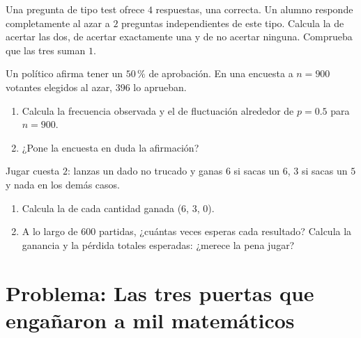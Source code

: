 \begin{exercise}[$\star\star$]\label{exo:g10:proba:7}
Una pregunta de tipo test ofrece $4$ respuestas, una correcta. Un alumno
responde completamente al azar a $2$ preguntas independientes de este
tipo. Calcula la  de acertar las dos, de acertar exactamente
una y de no acertar ninguna. Comprueba que las tres  suman
$1$.
\end{exercise}

\begin{exercise}[$\star\star$]\label{exo:g10:proba:8}
Un político afirma tener un $50\,\%$ de aprobación. En una encuesta a
$n = 900$ votantes elegidos al azar, $396$ lo aprueban.
\begin{enumerate}
  \item Calcula la frecuencia observada y el  de fluctuación
        alrededor de $p = 0.5$ para $n = 900$.
  \item ¿Pone la encuesta en duda la afirmación?
\end{enumerate}
\end{exercise}

\begin{exercise}[$\star\star\star$]\label{exo:g10:proba:9}
Jugar cuesta $2$: lanzas un dado no trucado y ganas $6$ si sacas un $6$,
$3$ si sacas un $5$ y nada en los demás casos.
\begin{enumerate}
  \item Calcula la  de cada cantidad ganada ($6$, $3$, $0$).
  \item A lo largo de $600$ partidas, ¿cuántas veces esperas cada
        resultado? Calcula la ganancia y la pérdida totales esperadas:
        ¿merece la pena jugar?
\end{enumerate}
\end{exercise}

\section{Problema: Las tres puertas que engañaron a mil matemáticos}

